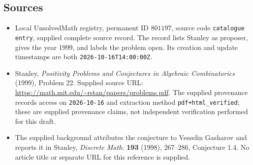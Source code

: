 \documentclass[11pt]{article}
\begin{document}
\subsection{Sources}
\begin{itemize}
\item Local UnsolvedMath registry, permanent ID \(801197\), source code \texttt{catalogue entry}, supplied complete source record. The record lists Stanley as proposer, gives the year 1999, and labels the problem open. Its creation and update timestamps are both \texttt{2026-10-16T14:00:00Z}.
\item Stanley, \emph{Positivity Problems and Conjectures in Algebraic Combinatorics} (1999), Problem 22. Supplied source URL: \url{https://math.mit.edu/~rstan/papers/problems.pdf}. The supplied provenance records access on \texttt{2026-10-16} and extraction method \texttt{pdf+html\_verified}; these are supplied provenance claims, not independent verification performed for this draft.
\item The supplied background attributes the conjecture to Vesselin Gasharov and reports it in Stanley, \emph{Discrete Math.} \textbf{193} (1998), 267--286, Conjecture 1.4. No article title or separate URL for this reference is supplied.
\end{itemize}
\end{document}
